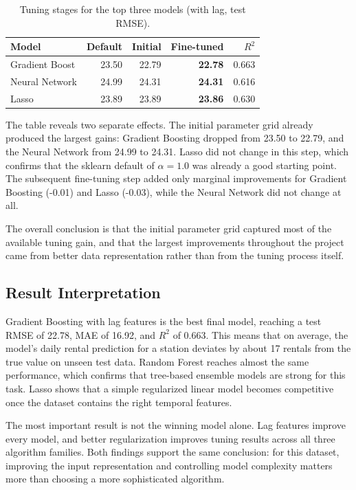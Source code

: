 \begin{table}[htbp]
\caption{Tuning stages for the top three models (with lag, test RMSE).}
\label{tab:tuning}
\centering
\scriptsize
\begin{tabularx}{\columnwidth}{p{} r r r r}
\toprule
\textbf{Model} & \textbf{Default} & \textbf{Initial} & 
\textbf{Fine-tuned} & \textbf{$R^2$} \\
\midrule
Gradient Boost & 23.50 & 22.79 & \textbf{22.78} & 0.663 \\
Neural Network & 24.99 & 24.31 & \textbf{24.31} & 0.616 \\
Lasso          & 23.89 & 23.89 & \textbf{23.86} & 0.630 \\
\bottomrule
\end{tabularx}
\end{table}

The table reveals two separate effects. The initial parameter grid 
already produced the largest gains: Gradient Boosting dropped from 
23.50 to 22.79, and the Neural Network from 24.99 to 24.31. Lasso 
did not change in this step, which confirms that the sklearn default 
of $\alpha = 1.0$ was already a good starting point. The subsequent 
fine-tuning step added only marginal improvements for Gradient 
Boosting (-0.01) and Lasso (-0.03), while the Neural Network did 
not change at all.

The overall conclusion is that the initial parameter grid captured 
most of the available tuning gain, and that the largest improvements 
throughout the project came from better data representation rather 
than from the tuning process itself.

\subsection{Result Interpretation}

Gradient Boosting with lag features is the best final model, reaching 
a test RMSE of 22.78, MAE of 16.92, and $R^2$ of 0.663. This means 
that on average, the model's daily rental prediction for a station 
deviates by about 17 rentals from the true value on unseen test data. 
Random Forest reaches almost the same performance, which confirms that 
tree-based ensemble models are strong for this task. Lasso shows that 
a simple regularized linear model becomes competitive once the dataset 
contains the right temporal features.

The most important result is not the winning model alone. Lag features 
improve every model, and better regularization improves tuning results 
across all three algorithm families. Both findings support the same 
conclusion: for this dataset, improving the input representation and 
controlling model complexity matters more than choosing a more 
sophisticated algorithm.